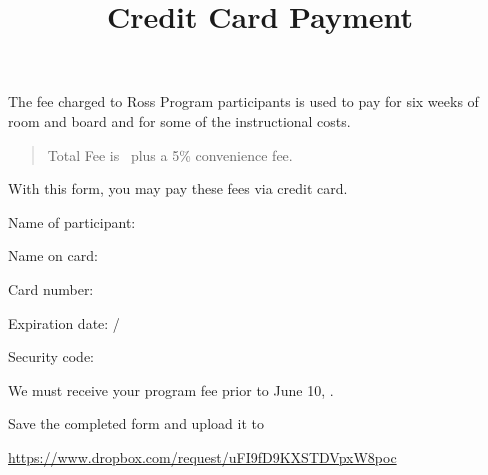 \documentclass[11pt]{ross}
\title{Credit Card Payment}
\begin{document}
\maketitle

The fee charged to Ross Program participants is used to pay for six
weeks of room and board and for some of the instructional costs.
\begin{quote}
  Total Fee is \totalfee\ plus a 5\% convenience fee.
\end{quote}

With this form, you may pay these fees via credit card.

Name of participant: 

Name on card:  

Card number:  

Expiration date:   / 

Security code:   

We must receive your program fee prior to June 10, \the\year.

Save the completed form and upload it to

\begin{center}
  \url{https://www.dropbox.com/request/uFI9fD9KXSTDVpxW8poc}
\end{center}
\end{document}
